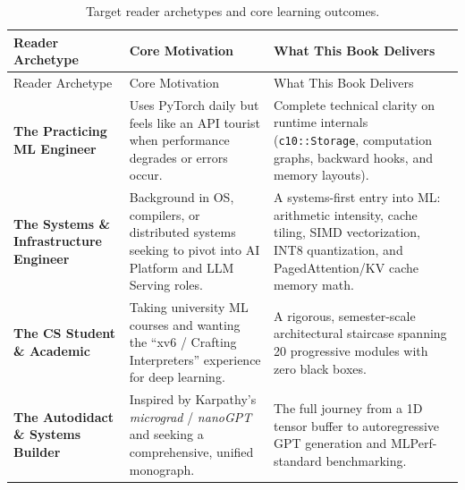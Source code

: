\documentclass[
  letterpaper,
]{scrbook}
\begin{document}
\begin{longtable}[]{@{}
  >{\raggedright\arraybackslash}p{}
  >{\raggedright\arraybackslash}p{}
  >{\raggedright\arraybackslash}p{}@{}}
\caption{Target reader archetypes and core learning
outcomes.}\label{tbl-target-audience}\tabularnewline
\toprule\noalign{}
\begin{minipage}[b]{\linewidth}\raggedright
Reader Archetype
\end{minipage} & \begin{minipage}[b]{\linewidth}\raggedright
Core Motivation
\end{minipage} & \begin{minipage}[b]{\linewidth}\raggedright
What This Book Delivers
\end{minipage} \\
\midrule\noalign{}
\endfirsthead
\toprule\noalign{}
\begin{minipage}[b]{\linewidth}\raggedright
Reader Archetype
\end{minipage} & \begin{minipage}[b]{\linewidth}\raggedright
Core Motivation
\end{minipage} & \begin{minipage}[b]{\linewidth}\raggedright
What This Book Delivers
\end{minipage} \\
\midrule\noalign{}
\endhead
\bottomrule\noalign{}
\endlastfoot
\textbf{The Practicing ML Engineer} & Uses PyTorch daily but feels like
an API tourist when performance degrades or errors occur. & Complete
technical clarity on runtime internals (\texttt{c10::Storage},
computation graphs, backward hooks, and memory layouts). \\
\textbf{The Systems \& Infrastructure Engineer} & Background in OS,
compilers, or distributed systems seeking to pivot into AI Platform and
LLM Serving roles. & A systems-first entry into ML: arithmetic
intensity, cache tiling, SIMD vectorization, INT8 quantization, and
PagedAttention/KV cache memory math. \\
\textbf{The CS Student \& Academic} & Taking university ML courses and
wanting the ``xv6 / Crafting Interpreters'' experience for deep
learning. & A rigorous, semester-scale architectural staircase spanning
20 progressive modules with zero black boxes. \\
\textbf{The Autodidact \& Systems Builder} & Inspired by Karpathy's
\emph{micrograd} / \emph{nanoGPT} and seeking a comprehensive, unified
monograph. & The full journey from a 1D tensor buffer to autoregressive
GPT generation and MLPerf-standard benchmarking. \\
\end{longtable}
\end{document}
